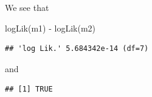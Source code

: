 \documentclass[
  ignorenonframetext,
]{beamer}
\newenvironment{Shaded}{\begin{snugshade}}{\end{snugshade}}
\newcommand{\FunctionTok}[1]{\textcolor[rgb]{0.00,0.00,0.00}{#1}}
\newcommand{\NormalTok}[1]{#1}
\newcommand{\OtherTok}[1]{\textcolor[rgb]{0.56,0.35,0.01}{#1}}
\newcommand{\SpecialCharTok}[1]{\textcolor[rgb]{0.00,0.00,0.00}{#1}}
\begin{document}
\begin{frame}[fragile]{}
\protect\hypertarget{section-7}{}
We see that

\vspace{12pt}

\begin{Shaded}
\begin{Highlighting}[]
\FunctionTok{logLik}\NormalTok{(m1) }\SpecialCharTok{{-}} \FunctionTok{logLik}\NormalTok{(m2)}
\end{Highlighting}
\end{Shaded}

\begin{verbatim}
## 'log Lik.' 5.684342e-14 (df=7)
\end{verbatim}

\vspace{12pt}
\normalsize

and

\vspace{12pt}
\footnotesize

\begin{Shaded}
\end{Shaded}

\begin{verbatim}
## [1] TRUE
\end{verbatim}
\end{frame}
\end{document}
